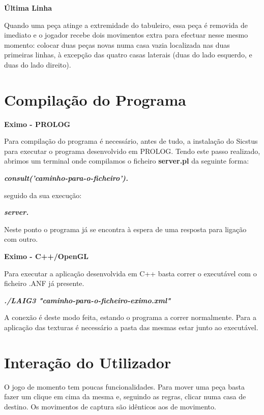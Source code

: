 \documentclass[a4paper]{article}
\begin{document}
\large{\textbf{Última Linha}}
\begin{small}

Quando uma peça atinge a extremidade do tabuleiro, essa peça é removida de imediato e o jogador recebe dois movimentos extra para efectuar nesse mesmo momento: colocar duas peças novas numa casa vazia localizada nas duas primeiras linhas, à excepção das quatro casas laterais (duas do lado esquerdo, e duas do lado direito).
\end{small}\newline


\section{Compilação do Programa}
\large{\textbf{Eximo - PROLOG}}

Para compilação do programa é necessário, antes de tudo, a instalação do Sicstus para executar o programa desenvolvido em PROLOG. Tendo este passo realizado, abrimos um terminal onde compilamos o ficheiro \textbf{server.pl} da seguinte forma:

\textbf{\textit{consult('caminho-para-o-ficheiro').}}

seguido da sua execução:

\textbf{\textit{server.}}

Neste ponto o programa já se encontra à espera de uma resposta para ligação com outro.

\hfill

\large{\textbf{Eximo - C++/OpenGL}}

Para executar a aplicação desenvolvida em C++ basta correr o executável com o ficheiro .ANF já presente.

\textbf{\textit{./LAIG3 "caminho-para-o-ficheiro-eximo.xml"}}

A conexão é deste modo feita, estando o programa a correr normalmente. Para a aplicação das texturas é necessário a pasta das mesmas estar junto ao executável.

\section{Interação do Utilizador}
O jogo de momento tem poucas funcionalidades. Para mover uma peça basta fazer um clique em cima da mesma e, seguindo as regras, clicar numa casa de destino. Os movimentos de captura são idênticos aos de movimento.

\pagebreak
\end{document}
